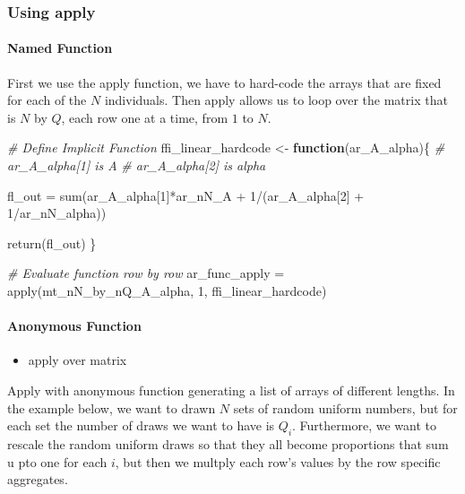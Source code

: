 \documentclass[
]{book}
\newenvironment{Shaded}{\begin{snugshade}}{\end{snugshade}}
\newcommand{\CommentTok}[1]{\textcolor[rgb]{0.56,0.35,0.01}{\textit{#1}}}
\newcommand{\ControlFlowTok}[1]{\textcolor[rgb]{0.13,0.29,0.53}{\textbf{#1}}}
\newcommand{\DecValTok}[1]{\textcolor[rgb]{0.00,0.00,0.81}{#1}}
\newcommand{\FunctionTok}[1]{\textcolor[rgb]{0.00,0.00,0.00}{#1}}
\newcommand{\NormalTok}[1]{#1}
\newcommand{\OtherTok}[1]{\textcolor[rgb]{0.56,0.35,0.01}{#1}}
\newcommand{\SpecialCharTok}[1]{\textcolor[rgb]{0.00,0.00,0.00}{#1}}
\providecommand{\tightlist}{%
  \setlength{\itemsep}{0pt}\setlength{\parskip}{0pt}}
\begin{document}
\hypertarget{using-apply}{%
\subsubsection{Using apply}\label{using-apply}}

\hypertarget{named-function}{%
\paragraph{Named Function}\label{named-function}}

First we use the apply function, we have to hard-code the arrays that are fixed for each of the \(N\) individuals. Then apply allows us to loop over the matrix that is \(N\) by \(Q\), each row one at a time, from \(1\) to \(N\).

\begin{Shaded}
\begin{Highlighting}[]
\CommentTok{\# Define Implicit Function}
\NormalTok{ffi\_linear\_hardcode }\OtherTok{\textless{}{-}} \ControlFlowTok{function}\NormalTok{(ar\_A\_alpha)\{}
  \CommentTok{\# ar\_A\_alpha[1] is A}
  \CommentTok{\# ar\_A\_alpha[2] is alpha}

\NormalTok{  fl\_out }\OtherTok{=} \FunctionTok{sum}\NormalTok{(ar\_A\_alpha[}\DecValTok{1}\NormalTok{]}\SpecialCharTok{*}\NormalTok{ar\_nN\_A }\SpecialCharTok{+}
                 \DecValTok{1}\SpecialCharTok{/}\NormalTok{(ar\_A\_alpha[}\DecValTok{2}\NormalTok{] }\SpecialCharTok{+} \DecValTok{1}\SpecialCharTok{/}\NormalTok{ar\_nN\_alpha))}

  \FunctionTok{return}\NormalTok{(fl\_out)}
\NormalTok{\}}

\CommentTok{\# Evaluate function row by row}
\NormalTok{ar\_func\_apply }\OtherTok{=} \FunctionTok{apply}\NormalTok{(mt\_nN\_by\_nQ\_A\_alpha, }\DecValTok{1}\NormalTok{, ffi\_linear\_hardcode)}
\end{Highlighting}
\end{Shaded}

\hypertarget{anonymous-function}{%
\paragraph{Anonymous Function}\label{anonymous-function}}

\begin{itemize}
\tightlist
\item
  apply over matrix
\end{itemize}

Apply with anonymous function generating a list of arrays of different lengths. In the example below, we want to drawn \(N\) sets of random uniform numbers, but for each set the number of draws we want to have is \(Q_i\). Furthermore, we want to rescale the random uniform draws so that they all become proportions that sum u pto one for each \(i\), but then we multply each row's values by the row specific aggregates.
\end{document}
